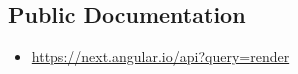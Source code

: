\subsection{Public Documentation}


\begin{itemize}
  \item \url{https://next.angular.io/api?query=render}
\end{itemize}


